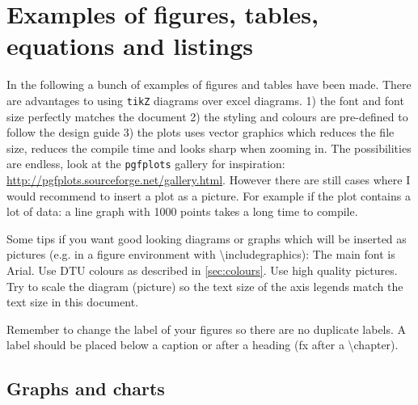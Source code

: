 \chapter{Examples of figures, tables, equations and listings}
In the following a bunch of examples of figures and tables have been
made. There are advantages to using \texttt{tikZ} diagrams over excel
diagrams. 1) the font and font size perfectly matches the document 2)
the styling and colours are pre-defined to follow the design guide 3)
the plots uses vector graphics which reduces the file size, reduces
the compile time and looks sharp when zooming in. The possibilities
are endless, look at the \texttt{pgfplots} gallery for inspiration:
\url{http://pgfplots.sourceforge.net/gallery.html}.
However there are still cases where I would recommend to insert a
plot as a picture. For example if the plot contains a lot of data: a
line graph with 1000 points takes a long time to compile.

Some tips if you want good looking diagrams or graphs which will be
inserted as pictures (e.g. in a figure environment with
\textbackslash includegraphics): The main font is Arial. Use DTU
colours as described in \cref{sec:colours}. Use high quality
pictures. Try to scale the diagram (picture) so the text size of the
axis legends match the text size in this document.

Remember to change the label of your figures so there are no
duplicate labels. A label should be placed below a caption or after a
heading (fx after a \textbackslash chapter).

\section{Graphs and charts}

\stackedColumnData


